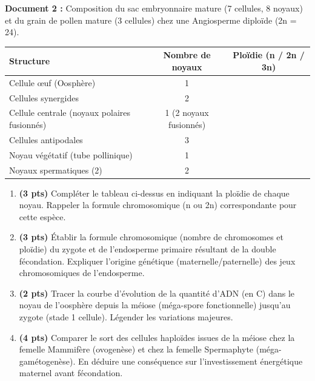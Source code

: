 \documentclass[11pt]{article}
\begin{document}
\begin{exercice}
\textbf{Document 2 :} Composition du sac embryonnaire mature (7 cellules, 8 noyaux) et du grain de pollen mature (3 cellules) chez une Angiosperme diploïde (2n = 24).  
\begin{center}
\begin{tabular}{|l|c|c|}
\hline \textbf{Structure} & \textbf{Nombre de noyaux} & \textbf{Ploïdie (n / 2n / 3n)} \\ \hline
Cellule œuf (Oosphère) & 1 & \\ \hline
Cellules synergides & 2 & \\ \hline
Cellule centrale (noyaux polaires fusionnés) & 1 (2 noyaux fusionnés) & \\ \hline
Cellules antipodales & 3 & \\ \hline
Noyau végétatif (tube pollinique) & 1 & \\ \hline
Noyaux spermatiques (2) & 2 & \\ \hline
\end{tabular}
\end{center}
\begin{enumerate}
    \item \textbf{(3 pts)} Compléter le tableau ci-dessus en indiquant la ploïdie de chaque noyau. Rappeler la formule chromosomique (n ou 2n) correspondante pour cette espèce.
    \item \textbf{(3 pts)} Établir la formule chromosomique (nombre de chromosomes et ploïdie) du zygote et de l'endosperme primaire résultant de la double fécondation. Expliquer l'origine génétique (maternelle/paternelle) des jeux chromosomiques de l'endosperme.
    \item \textbf{(2 pts)} Tracer la courbe d'évolution de la quantité d'ADN (en C) dans le noyau de l'oosphère depuis la méiose (méga-spore fonctionnelle) jusqu'au zygote (stade 1 cellule). Légender les variations majeures.
    \item \textbf{(4 pts)} Comparer le sort des cellules haploïdes issues de la méiose chez la femelle Mammifère (ovogenèse) et chez la femelle Spermaphyte (méga-gamétogenèse). En déduire une conséquence sur l'investissement énergétique maternel avant fécondation.
\end{enumerate}
\end{exercice}
\end{document}
